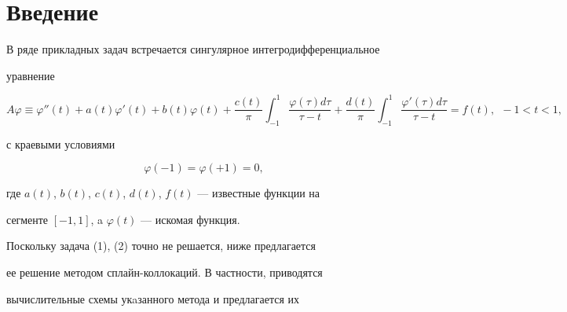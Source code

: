  




\maketitle 


\label{begin} 


 


 


 


\section*{Введение} 


 


В ряде прикладных задач встречается сингулярное интегродифференциальное 


уравнение 


\begin{equation} 


A\varphi\equiv\varphi''(t)+a(t)\varphi'(t)+b(t)\varphi(t)+ 


% 


\frac{c(t)}{\pi}\int^1_{-1}\frac{\varphi(\tau)d\tau}{\tau-t}+ 


\frac{d(t)}{\pi}\int^1_{-1}\frac{\varphi'(\tau)d\tau}{\tau-t}=f(t), 


\ \ -1<t<1, 


\end{equation} 


с краевыми условиями 


\begin{equation} 


\varphi(-1)=\varphi(+1)=0, 


\end{equation} 


где $a(t)$, $b(t)$, $c(t)$, $d(t)$, $f(t)$ --- известные функции на 


сегменте $[-1,1]$, a $\varphi(t)$ --- искомая функция. 


 


Поскольку задача (1), (2) точно не решается, ниже предлагается 


ее решение методом сплайн-коллокаций. В частности, приводятся 


вычислительные схемы укaзанного метода и предлагается их 


